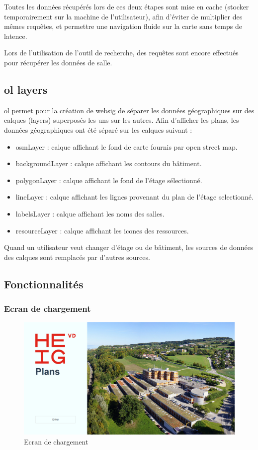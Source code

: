 \documentclass[
    iai, %
    il, %
]{heig-tb}
\begin{document}
Toutes les données récupérés lors de ces deux étapes sont mise en cache (stocker temporairement sur la machine de l'utilisateur),
afin d'éviter de multiplier des mêmes requêtes, et permettre une navigation fluide sur la carte sans temps de latence.

Lors de l'utilisation de l'outil de recherche, des requêtes sont encore effectués pour récupérer les données de salle.

\subsection{\gls{ol} layers}
\gls{ol} permet pour la création de \gls{websig} de séparer les données géographiques sur des calques (layers) superposés les uns sur les autres.
Afin d'afficher les plans, les données géographiques ont été séparé sur les calques suivant :

\begin{itemize}
    \item osmLayer : calque affichant le fond de carte fournis par open street map.
    \item backgroundLayer : calque affichant les contours du bâtiment.
    \item polygonLayer : calque affichant le fond de l'étage sélectionné.
    \item lineLayer : calque affichant les lignes provenant du plan de l'étage selectionné.
    \item labelsLayer : calque affichant les noms des salles.
    \item resourceLayer : calque affichant les icones des ressources.
\end{itemize}

Quand un utilisateur veut changer d'étage ou de bâtiment, les sources de données des calques sont remplacés par d'autres sources.

\subsection{Fonctionnalités}

\subsubsection{Ecran de chargement}

\begin{figure}[h]
    \centering
    \includegraphics[scale=0.3]{frontend-loading-screen.png}
    \caption{Ecran de chargement}
    \label{fig:ecran-chargement}
\end{figure}
\end{document}

